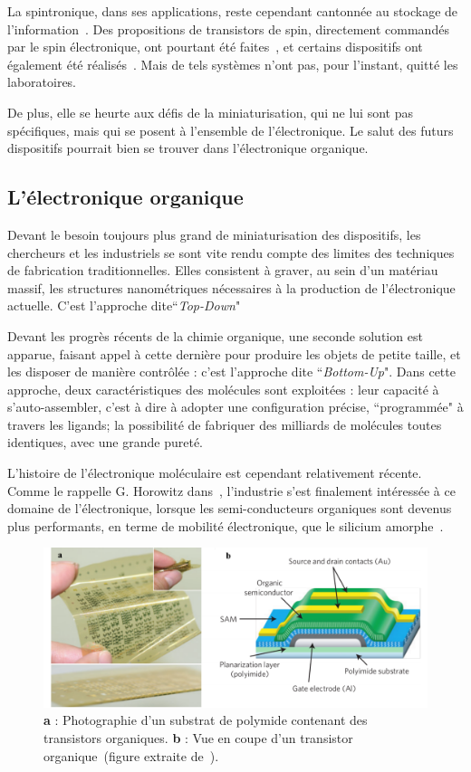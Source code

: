 La spintronique, dans ses applications, reste cependant cantonnée au stockage de  l'information~\cite{Awschalom2007}. Des propositions de transistors de spin, directement commandés par le spin électronique, ont pourtant été faites~\cite{Datta1990}, et certains dispositifs ont également été réalisés~\cite{Johnson1996,Huang2007}. Mais de tels systèmes n'ont pas, pour l'instant, quitté les laboratoires.

De plus, elle se heurte aux défis de la miniaturisation, qui ne lui sont pas spécifiques, mais qui se posent à l'ensemble de l'électronique. Le salut des futurs dispositifs pourrait bien se trouver dans l'électronique organique.

\subsection{L'électronique organique}
Devant le besoin toujours plus grand de miniaturisation des dispositifs, les chercheurs et les industriels se sont vite rendu compte des limites des techniques de fabrication traditionnelles. Elles consistent à graver, au sein d'un matériau massif, les structures nanométriques nécessaires à la production de l'électronique actuelle. C'est l'approche dite``\textit{Top-Down}"

Devant les progrès récents de la chimie organique, une seconde solution est apparue, faisant appel à cette dernière  pour produire les objets de petite taille, et les disposer de manière contrôlée : c'est l'approche dite ``\textit{Bottom-Up}". Dans cette approche, deux caractéristiques des molécules sont exploitées : leur capacité à s'auto-assembler, c'est à dire à adopter une configuration précise, ``programmée" à travers les ligands; la possibilité de fabriquer des milliards de molécules toutes identiques, avec une grande pureté. 

L'histoire de l'électronique moléculaire est cependant relativement récente. Comme le rappelle G. Horowitz dans~\cite{Klauk2007}, l'industrie s'est finalement intéressée à ce domaine de l'électronique, lorsque les semi-conducteurs organiques sont devenus plus performants, en terme de mobilité électronique, que le silicium amorphe~\cite{Lin1997}.
\begin{figure}
\centering \includegraphics[scale=0.45]{Spintronique/MolecularElec/MolecularElec.pdf}
\caption{\textbf{a} : Photographie d'un substrat de polymide contenant des transistors organiques. \textbf{b} : Vue en coupe d'un transistor organique~(figure extraite de~\cite{Sekitani2010}).}
\label{MolecularElec}
\end{figure}


